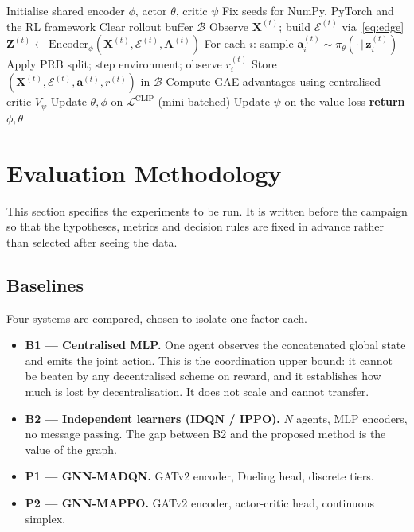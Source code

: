 \documentclass[journal]{IEEEtran}
\begin{document}
\begin{algorithm}[!t]
\caption{CTDE training loop (GNN-MAPPO variant)}
\label{alg:train}
\begin{algorithmic}[1]
\STATE Initialise shared encoder $\phi$, actor $\theta$, critic $\psi$
\STATE Fix seeds for NumPy, PyTorch and the RL framework
  \STATE Clear rollout buffer $\mathcal{B}$
    \STATE Observe $\mathbf{X}^{(t)}$; build $\mathcal{E}^{(t)}$ via~\eqref{eq:edge}
    \STATE $\mathbf{Z}^{(t)} \leftarrow \mathrm{Encoder}_\phi(\mathbf{X}^{(t)},\mathcal{E}^{(t)},\mathbf{A}^{(t)})$
    \STATE For each $i$: sample $\mathbf{a}_i^{(t)} \sim \pi_\theta(\cdot\,|\,\mathbf{z}_i^{(t)})$
    \STATE Apply PRB split; step environment; observe $r_i^{(t)}$
    \STATE Store $(\mathbf{X}^{(t)},\mathcal{E}^{(t)},\mathbf{a}^{(t)},r^{(t)})$ in $\mathcal{B}$
  \ENDFOR
  \STATE Compute GAE advantages using centralised critic $V_\psi$
    \STATE Update $\theta,\phi$ on $\mathcal{L}^{\mathrm{CLIP}}$ (mini-batched)
    \STATE Update $\psi$ on the value loss
  \ENDFOR
\ENDFOR
\STATE \textbf{return} $\phi,\theta$ 
\end{algorithmic}
\end{algorithm}

\section{Evaluation Methodology}\label{sec:eval}
 
This section specifies the experiments to be run. It is written before
the campaign so that the hypotheses, metrics and decision rules are
fixed in advance rather than selected after seeing the data.
 
\subsection{Baselines}
Four systems are compared, chosen to isolate one factor each.
 
\begin{itemize}
\item \textbf{B1 --- Centralised MLP.} One agent observes the
      concatenated global state and emits the joint action. This is the
      coordination upper bound: it cannot be beaten by any decentralised
      scheme on reward, and it establishes how much is lost by
      decentralisation. It does not scale and cannot transfer.
\item \textbf{B2 --- Independent learners (IDQN / IPPO).} $N$ agents,
      MLP encoders, no message passing. The gap between B2 and the
      proposed method is the value of the graph.
\item \textbf{P1 --- GNN-MADQN.} GATv2 encoder, Dueling head, discrete
      tiers.
\item \textbf{P2 --- GNN-MAPPO.} GATv2 encoder, actor-critic head,
      continuous simplex.
\end{itemize}
 
\end{document}
